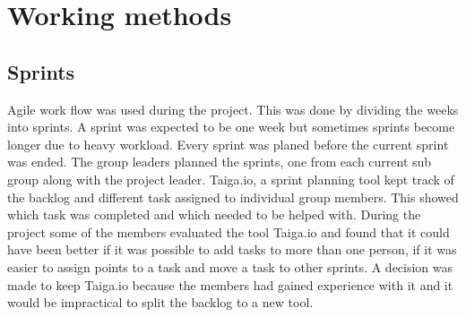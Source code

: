 \section{Working methods}
\subsection{Sprints} 
Agile work flow was used during the project. This was done by dividing the weeks into sprints. A sprint was expected to be one week but sometimes sprints become longer due to heavy workload. Every sprint was planed before the current sprint was ended. The group leaders planned the sprints, one from each current sub group along with the project leader. Taiga.io, a sprint planning tool kept track of the backlog and different task assigned to individual group members. This showed which task was completed and which needed to be helped with. During the project some of the members evaluated the tool Taiga.io and found that it could have been better if it was possible to add tasks to more than one person, if it was easier to assign points to a task and move a task to other sprints. A decision was made to keep Taiga.io because the members had gained experience with it and it would be impractical to split the backlog to a new tool.

